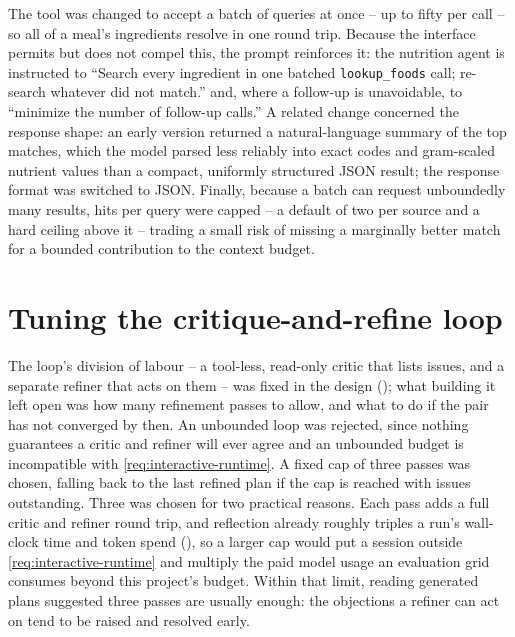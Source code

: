 The tool was changed to accept a batch of queries at once -- up to fifty per call -- so all of a meal's ingredients resolve in one round trip. Because the interface permits but does not compel this, the prompt reinforces it: the nutrition agent is instructed to \enquote{Search every ingredient in one batched \texttt{lookup\_foods} call; re-search whatever did not match.} and, where a follow-up is unavoidable, to \enquote{minimize the number of follow-up calls.} A related change concerned the response shape: an early version returned a natural-language summary of the top matches, which the model parsed less reliably into exact codes and gram-scaled nutrient values than a compact, uniformly structured JSON result; the response format was switched to JSON. Finally, because a batch can request unboundedly many results, hits per query were capped -- a default of two per source and a hard ceiling above it -- trading a small risk of missing a marginally better match for a bounded contribution to the context budget.

\section{Tuning the critique-and-refine loop}
\label{sec:impl-critic-design}

The loop's division of labour -- a tool-less, read-only critic that lists issues, and a separate refiner that acts on them -- was fixed in the design (); what building it left open was how many refinement passes to allow, and what to do if the pair has not converged by then. An unbounded loop was rejected, since nothing guarantees a critic and refiner will ever agree and an unbounded budget is incompatible with \ref{req:interactive-runtime}. A fixed cap of three passes was chosen, falling back to the last refined plan if the cap is reached with issues outstanding. Three was chosen for two practical reasons. Each pass adds a full critic and refiner round trip, and reflection already roughly triples a run's wall-clock time and token spend (), so a larger cap would put a session outside \ref{req:interactive-runtime} and multiply the paid model usage an evaluation grid consumes beyond this project's budget. Within that limit, reading generated plans suggested three passes are usually enough: the objections a refiner can act on tend to be raised and resolved early.

